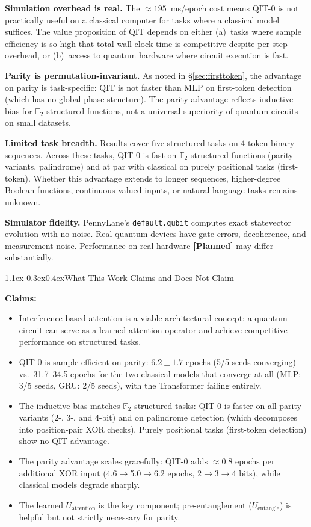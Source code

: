 \documentclass[11pt,a4paper]{article}
\makeatletter
\renewcommand\subsection{\@startsection{subsection}{2}{\z@}%
  {1.1ex \@plus 0.3ex}{0.4ex}{\normalfont\normalsize\bfseries}}
\newcommand{\Uent}{U_{\!\text{entangle}}}
\newcommand{\Uatt}{U_{\!\text{attention}}}
\newcommand{\planned}{\textcolor{gray!70!black}{\textbf{[Planned]}}}
\newcommand{\Ftwo}{\mathbb{F}_2}
\makeatother
\begin{document}
\textbf{Simulation overhead is real.} The $\approx195$~ms/epoch cost means QIT-0 is not
practically useful on a classical computer for tasks where a classical model suffices.
The value proposition of QIT depends on either (a)~tasks where sample efficiency is so
high that total wall-clock time is competitive despite per-step overhead, or (b)~access
to quantum hardware where circuit execution is fast.

\textbf{Parity is permutation-invariant.} As noted in \S\ref{sec:firsttoken}, the
advantage on parity is task-specific: QIT is not faster than MLP on first-token
detection (which has no global phase structure). The parity advantage reflects inductive
bias for $\Ftwo$-structured functions, not a universal superiority of quantum circuits
on small datasets.

\textbf{Limited task breadth.} Results cover five structured tasks on 4-token binary
sequences. Across these tasks, QIT-0 is fast on $\mathbb{F}_2$-structured functions
(parity variants, palindrome) and at par with classical on purely positional tasks
(first-token). Whether this advantage extends to longer sequences, higher-degree Boolean
functions, continuous-valued inputs, or natural-language tasks remains unknown.

\textbf{Simulator fidelity.} PennyLane's \texttt{default.qubit} computes exact
statevector evolution with no noise. Real quantum devices have gate errors, decoherence,
and measurement noise. Performance on real hardware \planned{} may differ substantially.

\subsection{What This Work Claims and Does Not Claim}

\textbf{Claims:}
\begin{itemize}
  \item Interference-based attention is a viable architectural concept: a quantum circuit
        can serve as a learned attention operator and achieve competitive performance on
        structured tasks.
  \item QIT-0 is sample-efficient on parity: $6.2\pm1.7$ epochs (5/5 seeds converging)
        vs.\ 31.7--34.5 epochs for the two classical models that converge at all
        (MLP: 3/5 seeds, GRU: 2/5 seeds), with the Transformer failing entirely.
  \item The inductive bias matches $\mathbb{F}_2$-structured tasks: QIT-0 is faster
        on all parity variants (2-, 3-, and 4-bit) and on palindrome detection (which
        decomposes into position-pair XOR checks). Purely positional tasks (first-token
        detection) show no QIT advantage.
  \item The parity advantage scales gracefully: QIT-0 adds $\approx$0.8 epochs per
        additional XOR input (4.6$\to$5.0$\to$6.2 epochs, 2$\to$3$\to$4 bits),
        while classical models degrade sharply.
  \item The learned $\Uatt$ is the key component; pre-entanglement ($\Uent$) is helpful
        but not strictly necessary for parity.
\end{itemize}
\end{document}
